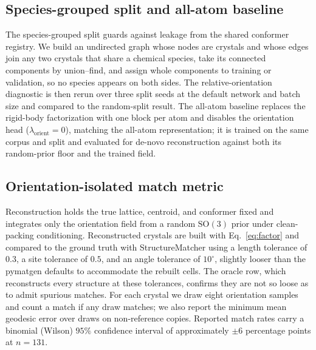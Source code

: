 \documentclass[10pt]{article}
\begin{document}
\subsection{Species-grouped split and all-atom baseline}
The species-grouped split guards against leakage from the shared conformer
registry. We build an undirected graph whose nodes are crystals and whose edges
join any two crystals that share a chemical species, take its connected
components by union--find, and assign whole components to training or validation,
so no species appears on both sides. The relative-orientation diagnostic is then
rerun over three split seeds at the default network and batch size and compared to
the random-split result. The all-atom baseline replaces the rigid-body
factorization with one block per atom and disables the orientation head
($\lambda_{\text{orient}}=0$), matching the all-atom representation; it is trained
on the same corpus and split and evaluated for de-novo reconstruction against both
its random-prior floor and the trained field.

\subsection{Orientation-isolated match metric}
Reconstruction holds the true lattice, centroid, and conformer fixed and
integrates only the orientation field from a random $\mathrm{SO}(3)$ prior under
clean-packing conditioning. Reconstructed crystals are built with
Eq.~\eqref{eq:factor} and compared to the ground truth with
StructureMatcher \citep{ong2013pymatgen} using a length tolerance of $0.3$, a site
tolerance of $0.5$, and an angle tolerance of $10^\circ$, slightly looser than
the pymatgen defaults to accommodate the rebuilt cells. The oracle row, which
reconstructs every structure at these tolerances, confirms they are not so loose
as to admit spurious matches. For each crystal we draw eight orientation samples
and count a match if any draw matches; we also report the minimum mean geodesic
error over draws on non-reference copies. Reported match rates carry a binomial
(Wilson) $95\%$ confidence interval of approximately $\pm6$ percentage points at
$n=131$.
\end{document}
